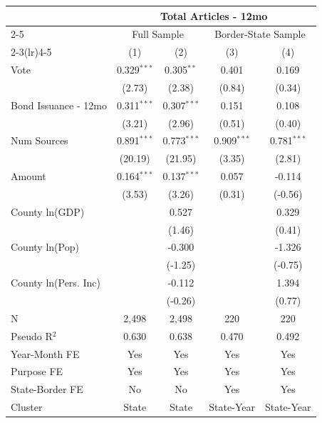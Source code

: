 \begingroup
\centering
\begin{tabular*}{\textwidth}{@{\extracolsep{\fill}}lcccc}
   \toprule
    & \multicolumn{4}{c}{Total Articles - 12mo}\\
   \cmidrule(lr){2-5}
    & \multicolumn{2}{c}{Full Sample} & \multicolumn{2}{c}{Border-State Sample}\\
   \cmidrule(lr){2-3}\cmidrule(lr){4-5}
                        & (1)           & (2)           & (3)           & (4)\\  
   \midrule 
   Vote                 & 0.329$^{***}$ & 0.305$^{**}$  & 0.401         & 0.169\\   
                        & (2.73)       & (2.38)       & (0.84)       & (0.34)\\   
   Bond Issuance - 12mo & 0.311$^{***}$ & 0.307$^{***}$ & 0.151         & 0.108\\   
                        & (3.21)       & (2.96)       & (0.51)       & (0.40)\\   
   Num Sources          & 0.891$^{***}$ & 0.773$^{***}$ & 0.909$^{***}$ & 0.781$^{***}$\\   
                        & (20.19)      & (21.95)      & (3.35)       & (2.81)\\   
   Amount               & 0.164$^{***}$ & 0.137$^{***}$ & 0.057         & -0.114\\   
                        & (3.53)       & (3.26)       & (0.31)       & (-0.56)\\   
   County ln(GDP)       &               & 0.527         &               & 0.329\\   
                        &               & (1.46)       &               & (0.41)\\   
   County ln(Pop)       &               & -0.300        &               & -1.326\\   
                        &               & (-1.25)      &               & (-0.75)\\   
   County ln(Pers. Inc) &               & -0.112        &               & 1.394\\   
                        &               & (-0.26)      &               & (0.77)\\   
   \hline
   N         & 2,498         & 2,498         & 220           & 220\\  
   Pseudo R$^2$         & 0.630         & 0.638         & 0.470         & 0.492\\  
   Year-Month FE        & Yes           & Yes           & Yes           & Yes\\  
   Purpose FE           & Yes           & Yes           & Yes           & Yes\\  
   State-Border FE      & No            & No            & Yes           & Yes\\  
   Cluster              & State & State & State-Year & State-Year\\  
   \bottomrule
\end{tabular*}
\par\endgroup
